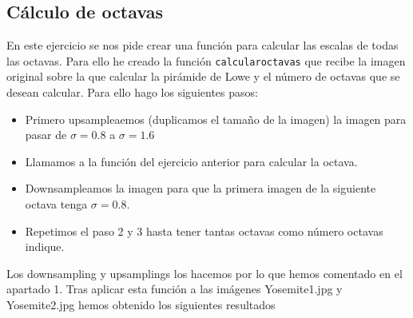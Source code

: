 \documentclass[12pt,spanish]{article}
\begin{document}
\subsection{Cálculo de octavas}
En este ejercicio se nos pide crear una función para calcular las escalas de todas las octavas. Para ello he creado la función \texttt{calcularoctavas} que recibe la imagen original sobre la que calcular la pirámide de Lowe y el número de octavas que se desean calcular. Para ello hago los siguientes pasos:

\begin{itemize}
	\item Primero upsampleaemos (duplicamos el tamaño de la imagen) la imagen para pasar de $\sigma = 0.8$ a $\sigma = 1.6$
	\item Llamamos a la función del ejercicio anterior para calcular la octava.
	\item Downsampleamos la imagen para que la primera imagen de la siguiente octava tenga $\sigma = 0.8$.
	\item Repetimos el paso 2 y 3 hasta tener tantas octavas como número octavas indique. 
\end{itemize}

Los downsampling y upsamplings los hacemos por lo que hemos comentado en el apartado 1. Tras aplicar esta función a las imágenes Yosemite1.jpg y Yosemite2.jpg hemos obtenido los siguientes resultados
\end{document}
